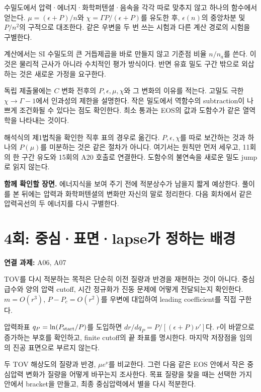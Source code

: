 \documentclass[
  10pt,
  a4paper,
]{article}
\begin{document}
수밀도에서 압력·에너지·화학퍼텐셜·음속을 각각 따로 맞추지 않고 하나의
함수에서 얻는다. \(\mu=(\epsilon+P)/n\)와
\(\chi=\Gamma P/(\epsilon+P)\)를 유도한 후, \(\epsilon(n)\)의 중앙차분
및 \(P/n^2\)의 구적으로 대조한다. 같은 우변을 두 번 쓰는 시험과 다른
계산 경로의 시험을 구별한다.

계산에서는 SI 수밀도의 큰 거듭제곱을 바로 만들지 않고 기준점 비율
\(n/n_a\)를 쓴다. 이것은 물리적 근사가 아니라 수치적인 평가 방식이다.
반면 유효 밀도 구간 밖으로 외삽하는 것은 새로운 가정을 요구한다.

독립 제출물에는 \(C\) 변화 전후의 \(P,\epsilon,\mu,\chi\)와 그 변화의
이유를 적는다. 고밀도 극한 \(\chi\to\Gamma-1\)에서 인과성의 제한을
설명한다. 작은 밀도에서 역함수의 subtraction이 나쁘게 조건화될 수 있다는
점도 확인한다. 최소 통과는 EOS의 값과 도함수가 같은 열역학을 나타내는
것이다.

해석식의 제1법칙을 확인한 직후 표의 경우로 옮긴다. \(P,\epsilon,\chi\)를
따로 보간하는 것과 하나의 \(P(\mu)\)를 미분하는 것은 같은 절차가 아니다.
여기서는 원칙만 먼저 세우고, 11회의 한 구간 유도와 15회의 A20 호출로
연결한다. 도함수의 불연속을 새로운 밀도 jump로 읽지 않는다.

\textbf{함께 확인할 장면.} 에너지식을 보여 주기 전에 적분상수가 남을지
짧게 예상한다. 풀이를 본 뒤에는 압력과 화학퍼텐셜의 변화만 자신의 말로
정리한다. 다음 회차에서 같은 압력곡선의 두 에너지를 다시 구별한다.

\section{4회: 중심·표면·lapse가 정하는
배경}\label{uxd68c-uxc911uxc2ecuxd45cuxba74lapseuxac00-uxc815uxd558uxb294-uxbc30uxacbd}

\textbf{연결 과제:} A06, A07

TOV를 다시 적분하는 목적은 단순히 이전 질량과 반경을 재현하는 것이
아니다. 중심 급수와 양의 압력 cutoff, 시간 정규화가 진동 문제에 어떻게
전달되는지 확인한다. \(m=O(r^3)\), \(P-P_c=O(r^2)\)를 우변에 대입하여
leading coefficient를 직접 구한다.

압력좌표 \(q_P=\ln(P_{\rm start}/P)\)를 도입하면
\(dr/dq_P=P/[(\epsilon+P)\nu']\)다. \(r\)이 바깥으로 증가하는 부호를
확인하고, finite cutoff의 끝 좌표를 명시한다. 마지막 저장점을 임의의
진공 표면으로 부르지 않는다.

두 TOV 해상도의 질량과 반경, \(\mu e^\nu\)를 비교한다. 그런 다음 같은
EOS 안에서 작은 중심압력 변화가 질량을 어떻게 바꾸는지 조사한다. 목표
질량을 찾을 때는 선택한 가지 안에서 bracket을 만들고, 최종 중심압력에서
별을 다시 적분한다.
\end{document}

